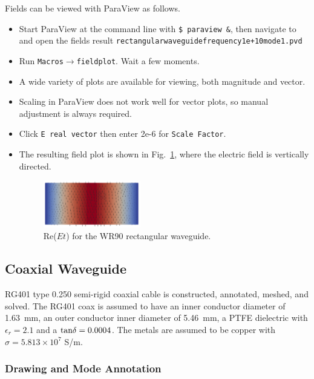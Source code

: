 \documentclass[titlepage]{article}
\renewcommand\_{\textunderscore\linebreak[1]}
\begin{document}
Fields can be viewed with ParaView as follows.
\begin{itemize}
\item Start ParaView at the command line with \verb+$ paraview &+, then navigate to and open the fields result \newline \texttt{rectangular\_waveguide\_frequency\_1e+10\_mode\_1.pvd}
\item Run \texttt{Macros}$\rightarrow$\texttt{field\_plot}.  Wait a few moments.
\item A wide variety of plots are available for viewing, both magnitude and vector.
\item Scaling in ParaView does not work well for vector plots, so manual adjustment is always required.
\item Click \texttt{E real vector} then enter 2e-6 for \texttt{Scale Factor}.
\item The resulting field plot is shown in Fig.~\ref{fig:rectangular_ReEt}, where the electric field is vertically directed.
\begin{figure}[H]
  \centering
  \includegraphics[width=0.4\textwidth]{../tutorials/OpenParEM2D/rectangular_waveguide/screenshots/rectangular_ReEt}
  \caption{Re($Et$) for the WR90 rectangular waveguide.}
  \label{fig:rectangular_ReEt}
\end{figure}
\end{itemize}


\subsection{Coaxial Waveguide}

RG401 type 0.250 semi-rigid coaxial cable is constructed, annotated, meshed, and solved.  The RG401 coax is assumed to have an inner conductor diameter of 1.63~mm, an outer conductor inner diameter of 5.46~mm, a PTFE dielectric with $\epsilon_r=2.1$ and a $\textnormal{tan}\delta=0.0004$.  The metals are assumed to be copper with $\sigma=5.813\times 10^7$ S/m.

\subsubsection{Drawing and Mode Annotation}
\end{document}
